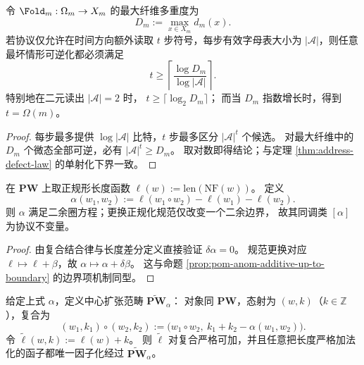 \begin{theorem}[残差外置的时间下界]\label{thm:xi-time-lower-bound-from-max-fiber}
令 \(\Fold_m:\Omega_m\to X_m\) 的最大纤维多重度为
\[
D_m:=\max_{x\in X_m}d_m(x).
\]
若协议仅允许在时间方向额外读取 \(t\) 步符号，每步有效字母表大小为 \(|\mathcal A|\)，则任意最坏情形可逆化都必须满足
\[
t\ge
\left\lceil
\frac{\log D_m}{\log |\mathcal A|}
\right\rceil.
\]
特别地在二元读出 \(|\mathcal A|=2\) 时，
\(
t\ge \lceil \log_2 D_m\rceil
\)；
而当 \(D_m\) 指数增长时，得到 \(t=\Omega(m)\)。
\end{theorem}

\begin{proof}
每步最多提供 \(\log|\mathcal A|\) 比特，\(t\) 步最多区分 \(|\mathcal A|^t\) 个候选。
对最大纤维中的 \(D_m\) 个微态全部可逆，必有 \(|\mathcal A|^t\ge D_m\)。
取对数即得结论；与定理 \ref{thm:address-defect-law} 的单射化下界一致。
\end{proof}

\begin{proposition}[时间长度异常为二余圈]\label{prop:xi-time-length-cocycle}
在 \(\mathbf{PW}\) 上取正规形长度函数
\(
\ell(w):=\mathrm{len}(\mathrm{NF}(w))
\)。
定义
\[
\alpha(w_1,w_2):=\ell(w_1\circ w_2)-\ell(w_1)-\ell(w_2).
\]
则 \(\alpha\) 满足二余圈方程；更换正规化规范仅改变一个二余边界，
故其同调类 \([\alpha]\) 为协议不变量。
\end{proposition}

\begin{proof}
由复合结合律与长度差分定义直接验证
\(
\delta\alpha=0
\)。
规范更换对应 \(\ell\mapsto \ell+\beta\)，故
\(
\alpha\mapsto \alpha+\delta\beta
\)。
这与命题 \ref{prop:pom-anom-additive-up-to-boundary} 的边界项机制同型。
\end{proof}

\begin{theorem}[时间中心扩张的普适消缺]\label{thm:xi-time-central-extension-universal}
给定上式 \(\alpha\)，定义中心扩张范畴 \(\widetilde{\mathbf{PW}}_{\alpha}\)：
对象同 \(\mathbf{PW}\)，态射为 \((w,k)\)（\(k\in\mathbb Z\)），复合为
\[
(w_1,k_1)\circ(w_2,k_2):=
\bigl(w_1\circ w_2,\ k_1+k_2-\alpha(w_1,w_2)\bigr).
\]
令
\(
\widetilde\ell(w,k):=\ell(w)+k
\)。
则 \(\widetilde\ell\) 对复合严格可加，并且任意把长度严格加法化的函子都唯一因子化经过 \(\widetilde{\mathbf{PW}}_{\alpha}\)。
\end{theorem}

